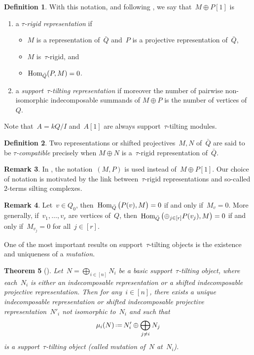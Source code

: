 \documentclass{amsart}
\newtheorem{theorem}{Theorem}[part]
\theoremstyle{definition}
\newtheorem{definition}[theorem]{Definition}
\newtheorem{remark}[theorem]{Remark}
\newcommand{\eqdef}{\mbox{\,\raisebox{0.2ex}{\scriptsize\ensuremath{\mathrm:}}\ensuremath{=}\,}} %
\newcommand{\darkblue}{\color{darkblue}} %
\newcommand{\defn}[1]{\textsl{\darkblue #1}} %
\newcommand{\Hom}[1]{\operatorname{{\rm Hom}}_{#1}}
\begin{document}
\begin{definition}
\label{def: tau-rigid and stautilt}
With this notation, and following \cite{AdachiIyamaReiten}, we say that~$M\oplus P[1]$ is
\begin{enumerate}
 \item a \defn{$\tau$-rigid representation} if
   \begin{itemize}
     \item $M$ is a representation of~$\bar Q$ and~$P$ is a projective representation of~$\bar Q$,
     \item $M$ is~$\tau$-rigid, and
     \item $\Hom{\bar Q}(P,M) = 0$.
   \end{itemize}
 \item a \defn{support~$\tau$-tilting representation} if moreover the number of pairwise non-isomorphic indecomposable summands of $M\oplus P$ is the number of vertices of~$Q$.
\end{enumerate}
Note that~$A = kQ/I$ and~$A[1]$ are always support~$\tau$-tilting modules.
\end{definition}

\begin{definition}\label{def: tau-compatibility}
 Two representations or shifted projectives~$M, N$ of~$\bar Q$ are said to be \defn{$\tau$-compatible} precisely when $M\oplus N$ is a~$\tau$-rigid representation of~$\bar Q$.
\end{definition}


\begin{remark}
In \cite{AdachiIyamaReiten}, the notation~$(M,P)$ is used instead of~$M\oplus P[1]$.  Our choice of notation is motivated by the link between~$\tau$-rigid representations and so-called $2$-terms silting complexes.
\end{remark}

\begin{remark}
Let~$v\in Q_0$, then~$\Hom{\bar Q} \big( P(v), M \big) = 0$ if and only if~$M_v=0$. More generally, if~$v_1, \ldots, v_r$ are vertices of~$Q$, then~$\Hom{\bar Q}\big( {\oplus_{j \in [r]} P(v_j)}, M \big) = 0$ if and only if~$M_{v_j}=0$ for all~$j \in [r]$. 
\end{remark}

One of the most important results on support~$\tau$-tilting objects is the existence and uniqueness of a \defn{mutation}.  

\begin{theorem}[\cite{AdachiIyamaReiten}]\label{thm:mutationstautilts}
Let~$N = \bigoplus_{i \in [n]} N_i$ be a basic support~$\tau$-tilting object, where each~$N_i$ is either an indecomposable representation or a shifted indecomposable projective representation.
Then for any~${i \in [n]}$, there exists a unique indecomposable representation or shifted indecomposable projective representation~$N'_i$ not isomorphic to~$N_i$ and such that
\[
\mu_i(N) \eqdef N'_i \oplus \bigoplus_{j\neq i} N_j
\]
is a support~$\tau$-tilting object (called mutation of~$N$ at~$N_i$).
\end{theorem}
\end{document}
